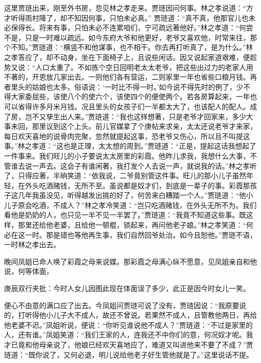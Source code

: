 \begin{parag}
    这里贾琏出来，刚至外书房，忽见林之孝走来。贾琏因问何事。林之孝说道：“方才听得雨村降了，却不知因何事，只怕未必真。” 贾琏道：“真不真，他那官儿也未必保得长。将来有事，只怕未必不连累咱们，宁可疏远著他好。”林之孝道：“何尝不是，只是一时难以疏远。如今东府大爷和他更好，老爷又喜欢他，时常来往，那个不知。”贾琏道：“横竖不和他谋事，也不相干。你去再打听真了，是为什么。”林之孝答应了，却不动身，坐在下面椅子上，且说些闲话。因又说起家道艰难，便趁势又说：“人口太重了。不如拣个空日回明老太太老爷，把这些出过力的老家人用不著的，开恩放几家出去。一则他们各有营运，二则家里一年也省些口粮月钱。再者里头的姑娘也太多。俗语说：‘一时比不得一时。’如今说不得先时的例了，少不得大家委屈些，该使八个的使六个，该使四个的便使两个。若各房算起来，一年也可以省得许多月米月钱。况且里头的女孩子们一半都太大了，也该配人的配人。成了房，岂不又孳生出人来。”贾琏道：“我也这样想著，只是老爷才回家来，多少大事未回，那里议到这个上头。前儿官媒拿了个庚帖来求亲，太太还说老爷才来家，每日欢天喜地的说骨肉完聚，忽然就提起这事，恐老爷又伤心，所以且不叫提这事。”林之孝道：“这也是正理，太太想的周到。”贾琏道：“正是，提起这话我想起了一件事来。我们旺儿的小子要说太太房里的彩霞。他昨儿求我，我想什么大事，不管谁去说一声去。这会子有谁闲著，我打发个人去说一声，就说我的话。”林之孝听了，只得应著，半晌笑道：“依我说，二爷竟别管这件事。旺儿的那小儿子虽然年轻，在外头吃酒赌钱，无所不至。虽说都是奴才们，到底是一辈子的事。彩霞那孩子这几年我虽没见，听得越发出挑的好了，何苦来白糟踏一个人。”贾琏道：“他小儿子原会吃酒，不成人？”林之孝冷笑道：“岂只吃酒赌钱，在外头无所不为。我们看他是奶奶的人，也只见一半不见一半罢了。”贾琏道：“我竟不知道这些事。既这样，那里还给他老婆，且给他一顿棍，锁起来，再问他老子娘。”林之孝笑道：“何必在这一时。那是错也等他再生事，我们自然回爷处治。如今且恕他。”贾琏不语，一时林之孝出去。
\end{parag}


\begin{parag}
    晚间凤姐已命人唤了彩霞之母来说媒。那彩霞之母满心纵不愿意，见凤姐亲自和他说，何等体面，\begin{note}庚辰双行夹批：今时人女儿因图此现在体面误了多少，此正是因今时女儿一笑。\end{note}便心不由意的满口应了出去。今凤姐问贾琏可说了没有，贾琏因说：“我原要说的，打听得他小儿子大不成人，故还不曾说。若果然不成人，且管教他两日，再给他老婆不迟。”凤姐听说，便说：“你听见谁说他不成人？”贾琏道：“不过是家里的人，还有谁。”凤姐笑道：“我们王家的人，连我还不中你们的意，何况奴才呢。我才已竟和他母亲说了，他娘已经欢天喜地应了，难道又叫进他来不要了不成？”贾琏道：“既你说了，又何必退，明儿说给他老子好生管他就是了。”这里说话不提。
\end{parag}


